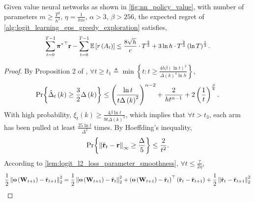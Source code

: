 \begin{thm}
\label{thm:logit_learning_main_result}
    Given value neural networks as shown in \cref{fig:nn_policy_value}, with number of parameters $m \ge \frac{T^2}{h^2}$, $\eta = \frac{1}{h m}$, $\alpha > 3$, $\beta > 256$, the expected regret of \cref{alg:logit_learning_eps_greedy_exploration} satisfies,
\begin{equation*}
\small
\begin{split}
    \sum\limits_{t=0}^{T-1}{ {\rvpi^*}^\top \rvr } - \sum\limits_{t=0}^{T-1}{ \sE \left[ r\left(A_t\right) \right] } \le \frac{8 \sqrt{h}}{c} \cdot T^{\frac{2}{3}} + 3 \ln{h} \cdot T^{\frac{2}{3}} \left(\ln{T}\right)^{\frac{1}{3}}.
\end{split}
\end{equation*}
\end{thm}
\begin{proof}
    By Proposition 2 of \citep{seldin2017improved},
    $\forall t \ge t_1 \triangleq \min{\left\{ t : t \ge \frac{4 h \beta \left(\ln{t}\right)^2}{\Delta\left(k\right)^4 \ln{h}} \right\}}$,
\begin{equation*}
\begin{split}
    {\text{Pr}}{\left\{ \hat{\Delta}_t\left(k\right) \ge \frac{3}{2} \Delta\left(k\right) \right\}} \le \left( \frac{\ln{t}}{t \Delta\left(k\right)^2} \right)^{\alpha - 2} + \frac{2}{h t^{\alpha - 1}} + 2 \left(\frac{1}{t}\right)^{\frac{\beta}{8}}.
\end{split}
\end{equation*}
With high probability, $\xi_t\left(k\right) \ge \frac{4 \beta \ln{t}}{9 t \Delta\left(k\right)^2}$, which implies that $\forall t > t_3$,  each arm has been pulled at least $\frac{25\ln{t}}{\Delta^2}$ times. By Hoeffding's inequality,
\begin{equation*}
\begin{split}
    {\text{Pr}}{\left\{ \left\| \hat{{\mathbf{r}}}_t - {\mathbf{r}}\right\|_\infty \ge \frac{\Delta}{5} \right\}} \le \frac{2}{t^2}.
\end{split}
\end{equation*}
According to \cref{lem:logit_l2_loss_parameter_smoothness}, $\forall t \le \frac{\tau}{2 \eta}$,
\begin{equation*}
\begin{split}
    \frac{1}{2} \left\| \rvo\left( \rmW_{t+1} \right) - \hat{\rvr}_{t+1}\right\|_2^2 &= \frac{1}{2} \left\| \rvo\left( \rmW_{t+1} \right) - \hat{\rvr}_t\right\|_2^2 + \left( \rvo\left( \rmW_{t+1} \right) - \hat{\rvr}_t \right)^\top \left( \hat{\rvr}_t - \hat{\rvr}_{t+1} \right) + \frac{1}{2} \left\| \hat{\rvr}_t - \hat{\rvr}_{t+1} \right\|_2^2 \\

\end{split}
\end{equation*}
\end{proof}
